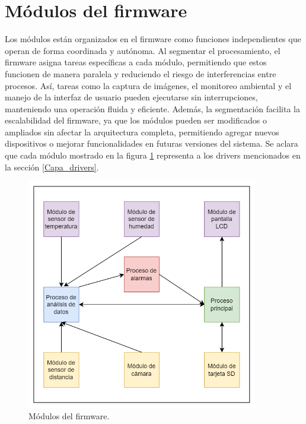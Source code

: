 \section{Módulos del firmware}

Los módulos están organizados en el firmware como funciones independientes que operan de forma coordinada y autónoma. Al segmentar el procesamiento, el firmware asigna tareas específicas a cada módulo, permitiendo que estos funcionen de manera paralela y reduciendo el riesgo de interferencias entre procesos. Así, tareas como la captura de imágenes, el monitoreo ambiental y el manejo de la interfaz de usuario pueden ejecutarse sin interrupciones, manteniendo una operación fluida y eficiente. Además, la segmentación facilita la escalabilidad del firmware, ya que los módulos pueden ser modificados o ampliados sin afectar la arquitectura completa, permitiendo agregar nuevos dispositivos o mejorar funcionalidades en futuras versiones del sistema. Se aclara que cada módulo mostrado en la figura \ref{fig:modulos_del_firmware} representa a los drivers mencionados en la sección \ref{Capa_drivers}.

\newpage

\vspace{1cm}
\begin{figure}[htbp]
	\centering
	\includegraphics[width=0.9\textwidth, height=0.5\textheight]{./Figures/modulos_del_firmware.png}
	\caption{Módulos del firmware.}
	\label{fig:modulos_del_firmware}
\end{figure}
\vspace{1cm}

